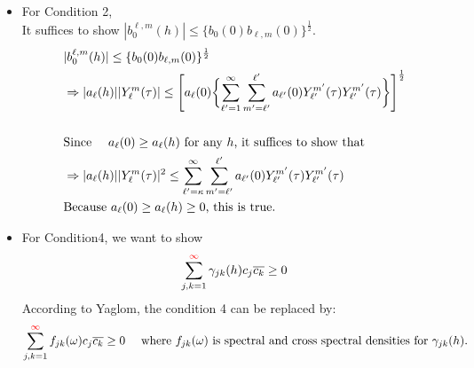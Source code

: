 \documentclass[11pt]{article}
\begin{document}
\begin{itemize}
\item
For Condition 2,\\
It suffices to show $|b_{0}^{\ell,m}(h)| \le \{b_{0}(0) b_{\ell,m}(0)\}^\frac{1}{2}$.\\
\begin{align*}
&|b_{0}^{\ell,m}(h)| \le \{b_{0}(0) b_{\ell,m}(0)\}^\frac{1}{2}\\
&\Rightarrow |a_{\ell}(h)||Y_{\ell}^{m}(\tau)| \le \Biggl[ a_{\ell}(0) \biggl\{ \sum_{{\ell}'=1}^{\infty} \sum_{m'=\ell'}^{\ell'} a_{{\ell}'}(0) Y_{{\ell}'}^{{m}'}(\tau) Y_{{\ell}'}^{{m}'}(\tau) \biggl\} \Biggl]^\frac{1}{2}\\
\\
&\text{Since \quad $a_{\ell}(0) \ge a_{\ell}(h)$ for any $h$, it suffices to show that }\\
&\Rightarrow |a_{\ell}(h)||Y_{\ell}^{m}(\tau)|^2 \le \sum_{{\ell}'=\kappa}^{\infty} \sum_{m'=\ell'}^{\ell'} a_{{\ell}'}(0) Y_{{\ell}'}^{{m}'}(\tau) Y_{{\ell}'}^{{m}'}(\tau)\\
&\text{Because $a_\ell(0) \ge a_\ell(h)  \ge 0$, this is true.}\\
\end{align*}

\item
For Condition4, we want to show\\
$$\sum_{j,k=1}^{{\color{red}\infty}} \gamma_{jk}(h) c_j \overline{c_k} \ge 0$$
According to Yaglom, the condition 4 can be replaced by:\\
$$\sum_{j,k=1}^{{\color{red}\infty}} f_{jk}(\omega) c_j \overline{c_k} \ge 0 \quad \text{ where } f_{jk}(\omega) \text{ is spectral and cross spectral densities for } \gamma_{jk}(h).$$


\end{itemize}
\end{document}
